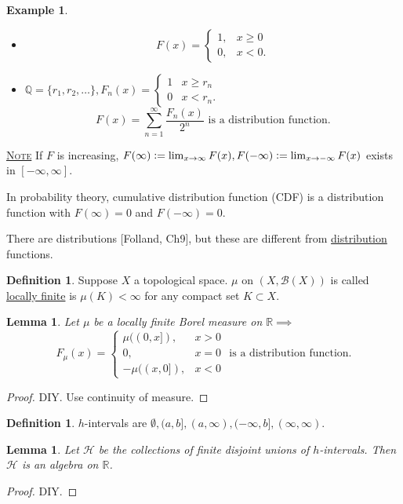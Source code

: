\documentclass{report}
\newcommand{\R}{\mathbb{R}}
\newcommand{\Q}{\mathbb{Q}}
\newcommand{\defeq}{\vcentcolon=}
\newcommand{\fancyem}[1]{\underline{\textsc{#1}}}
\newtheorem{lemma}[theorem]{Lemma}
\theoremstyle{definition}
\newtheorem{definition}[theorem]{Definition}
\newtheorem{example}[theorem]{Example}
\theoremstyle{remark}
\begin{document}
\begin{example}
\begin{itemize}
\item
\[
F(x) = \begin{cases}
1, & x \geq 0 \\
0, & x < 0.
\end{cases}
\]
\item
$\Q = \{r_1, r_2, \ldots\}, F_n(x) = \begin{cases}
1 & x \geq r_n \\
0 & x < r_n.
\end{cases}$
\[
F(x) = \sum_{n=1}^\infty \frac{F_n(x)}{2^n} \text{ is a distribution function.}
\]
\end{itemize}
\end{example}

\fancyem{Note} If $F$ is increasing, $F(\infty) \defeq \lim_{x \to \infty} F(x), F(-\infty) \defeq \lim_{x \to -\infty} F(x)$ exists in $[-\infty, \infty]$.

In probability theory, cumulative distribution function (CDF) is a distribution function with $F(\infty) = 0$ and $F(-\infty) = 0$.

There are distributions [Folland, Ch9], but these are different from \underline{distribution} functions.

\begin{definition}
Suppose $X$ a topological space. $\mu$ on $(X, \mathcal{B}(X))$ is called \underline{locally finite} is $\mu(K) < \infty$ for any compact set $K \subset X$.
\end{definition}

\begin{lemma}
Let $\mu$ be a locally finite Borel measure on $\R \implies$
\[
F_\mu(x) = \begin{cases}
\mu((0, x]), & x > 0 \\
0, & x = 0 \\
- \mu((x, 0]), & x < 0
\end{cases} \text{ is a distribution function.}
\]
\end{lemma}
\begin{proof}
DIY. Use continuity of measure.
\end{proof}

\begin{definition}
$h$-intervals are $\emptyset, (a, b], (a, \infty), (-\infty, b], (\infty, \infty)$.
\end{definition}

\begin{lemma}
Let $\mathcal{H}$ be the collections of finite disjoint unions of $h$-intervals. Then $\mathcal{H}$ is an algebra on $\R$.
\end{lemma}
\begin{proof}
DIY.
\end{proof}
\end{document}

